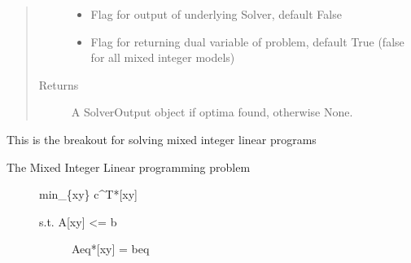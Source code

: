 \documentclass[letterpaper,10pt,english]{sphinxmanual}
\begin{document}
\begin{fulllineitems}
\begin{fulllineitems}
\begin{quote}
\begin{description}
\begin{itemize}
\item {} 
\sphinxAtStartPar
{} \textendash{} Flag for output of underlying Solver, default False

\item {} 
\sphinxAtStartPar
{} \textendash{} Flag for returning dual variable of problem, default True (false for all mixed integer models)

\end{itemize}

\item[{Returns}] \leavevmode
\sphinxAtStartPar
A SolverOutput object if optima found, otherwise None.

\end{description}\end{quote}

\end{fulllineitems}


\begin{fulllineitems}
\label{\detokenize{ppopt:ppopt.solver.Solver.solve_milp}}
\sphinxAtStartPar
This is the breakout for solving mixed integer linear programs
\begin{description}
\item[{The Mixed Integer Linear programming problem}] \leavevmode
\sphinxAtStartPar
min\_\{xy\} c\textasciicircum{}T*{[}xy{]}
\begin{description}
\item[{s.t.   A{[}xy{]} \textless{}= b}] \leavevmode
\sphinxAtStartPar
Aeq*{[}xy{]} = beq


\end{description}
\end{description}
\end{fulllineitems}
\end{fulllineitems}
\end{document}
